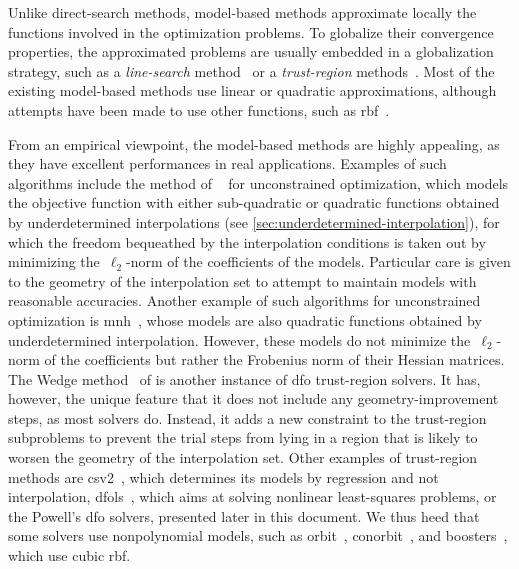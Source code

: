 Unlike direct-search methods, model-based methods approximate locally the functions involved in the optimization problems.
To globalize their convergence properties, the approximated problems are usually embedded in a globalization strategy, such as a \emph{line-search} method~\cite[ch.~3]{Nocedal_Wright_2006} or a \emph{trust-region} methods~\cite{Conn_Gould_Toint_2000,Yuan_2015}.
Most of the existing model-based methods use linear or quadratic approximations, although attempts have been made to use other functions, such as \gls{rbf}~\cite{Oeuvray_2005}.

From an empirical viewpoint, the model-based methods are highly appealing, as they have excellent performances in real applications.
Examples of such algorithms include the method of \citeauthor{Conn_Toint_1996}~\cite{Conn_Toint_1996} for unconstrained optimization, which models the objective function with either sub-quadratic or quadratic functions obtained by underdetermined interpolations (see \cref{sec:underdetermined-interpolation}), for which the freedom bequeathed by the interpolation conditions is taken out by minimizing the~$\ell_2$-norm of the coefficients of the models.
Particular care is given to the geometry of the interpolation set to attempt to maintain models with reasonable accuracies.
Another example of such algorithms for unconstrained optimization is \gls{mnh}~\cite{Wild_2008}, whose models are also quadratic functions obtained by underdetermined interpolation.
However, these models do not minimize the~$\ell_2$-norm of the coefficients but rather the Frobenius norm of their Hessian matrices.
The Wedge method~\cite{Marazzi_Nocedal_2002} of \citeauthor{Marazzi_Nocedal_2002} is another instance of \gls{dfo} trust-region solvers.
It has, however, the unique feature that it does not include any geometry-improvement steps, as most solvers do.
Instead, it adds a new constraint to the trust-region subproblems to prevent the trial steps from lying in a region that is likely to worsen the geometry of the interpolation set.
Other examples of trust-region methods are \gls{csv2}~\cite{Billups_Larson_Graf_2013}, which determines its models by regression and not interpolation, \gls{dfols}~\cite{Cartis_Etal_2019}, which aims at solving nonlinear least-squares problems, or the Powell's \gls{dfo} solvers, presented later in this document.
We thus heed that some solvers use nonpolynomial models, such as \gls{orbit}~\cite{Wild_Regis_Shoemaker_2008}, \gls{conorbit}~\cite{Regis_Wild_2017}, and \gls{boosters}~\cite{Oeuvray_Bierlaire_2009}, which use cubic \gls{rbf}.

